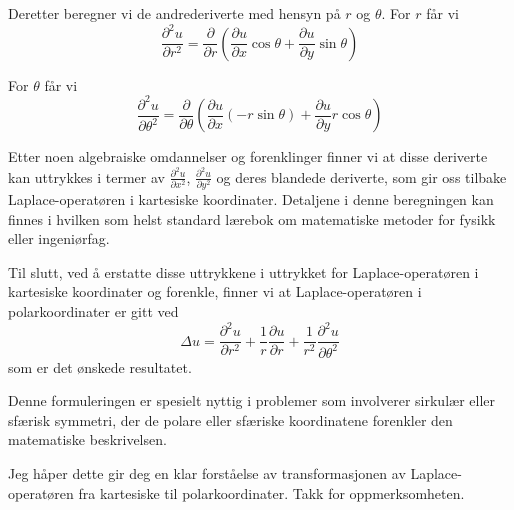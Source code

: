 Deretter beregner vi de andrederiverte med hensyn på $r$ og $\theta$. For $r$ får vi
\begin{equation*}
\frac{\partial^{2} u}{\partial r^{2}} = \frac{\partial}{\partial r}\left(\frac{\partial u}{\partial x}\cos\theta + \frac{\partial u}{\partial y}\sin\theta\right)
\end{equation*}

For $\theta$ får vi
\begin{equation*}
\frac{\partial^{2} u}{\partial \theta^{2}} = \frac{\partial}{\partial \theta}\left(\frac{\partial u}{\partial x}(-r\sin\theta) + \frac{\partial u}{\partial y}r\cos\theta\right)
\end{equation*}

Etter noen algebraiske omdannelser og forenklinger finner vi at disse deriverte kan uttrykkes i termer av $\frac{\partial^{2} u}{\partial x^{2}}$, $\frac{\partial^{2} u}{\partial y^{2}}$ og deres blandede deriverte, som gir oss tilbake Laplace-operatøren i kartesiske koordinater. Detaljene i denne beregningen kan finnes i hvilken som helst standard lærebok om matematiske metoder for fysikk eller ingeniørfag.

Til slutt, ved å erstatte disse uttrykkene i uttrykket for Laplace-operatøren i kartesiske koordinater og forenkle, finner vi at Laplace-operatøren i polarkoordinater er gitt ved
\begin{equation*}
    \Delta u=\frac{\partial^{2} u}{\partial r^{2}}+\frac{1}{r} \frac{\partial u}{\partial r}+\frac{1}{r^{2}} \frac{\partial^{2} u}{\partial \theta^{2}}
\end{equation*}
som er det ønskede resultatet.

Denne formuleringen er spesielt nyttig i problemer som involverer sirkulær eller sfærisk symmetri, der de polare eller sfæriske koordinatene forenkler den matematiske beskrivelsen.

Jeg håper dette gir deg en klar forståelse av transformasjonen av Laplace-operatøren fra kartesiske til polarkoordinater. Takk for oppmerksomheten.
